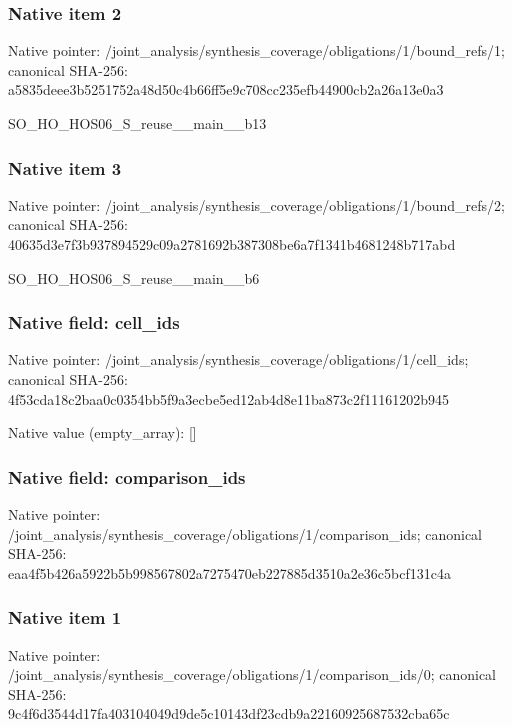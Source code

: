 \documentclass[10pt,a4paper]{article}
\begin{document}
\subsubsection{Native item 2}
Native pointer: /joint\_\allowbreak{}analysis/synthesis\_\allowbreak{}coverage/obligations/1/bound\_\allowbreak{}refs/1; canonical SHA-256: a5835deee3b5251752a48d50c4b66ff5e9c708cc235efb44900cb2a26a13e0a3

\begingroup\raggedright\sloppy SO\_\allowbreak{}HO\_\allowbreak{}HOS06\_\allowbreak{}S\_\allowbreak{}reuse\_\allowbreak{}\_\allowbreak{}main\_\allowbreak{}\_\allowbreak{}b13\par\endgroup

\subsubsection{Native item 3}
Native pointer: /joint\_\allowbreak{}analysis/synthesis\_\allowbreak{}coverage/obligations/1/bound\_\allowbreak{}refs/2; canonical SHA-256: 40635d3e7f3b937894529c09a2781692b387308be6a7f1341b4681248b717abd

\begingroup\raggedright\sloppy SO\_\allowbreak{}HO\_\allowbreak{}HOS06\_\allowbreak{}S\_\allowbreak{}reuse\_\allowbreak{}\_\allowbreak{}main\_\allowbreak{}\_\allowbreak{}b6\par\endgroup

\subsubsection{Native field: cell\_\allowbreak{}ids}
Native pointer: /joint\_\allowbreak{}analysis/synthesis\_\allowbreak{}coverage/obligations/1/cell\_\allowbreak{}ids; canonical SHA-256: 4f53cda18c2baa0c0354bb5f9a3ecbe5ed12ab4d8e11ba873c2f11161202b945

Native value (empty\_\allowbreak{}array): []

\subsubsection{Native field: comparison\_\allowbreak{}ids}
Native pointer: /joint\_\allowbreak{}analysis/synthesis\_\allowbreak{}coverage/obligations/1/comparison\_\allowbreak{}ids; canonical SHA-256: eaa4f5b426a5922b5b998567802a7275470eb227885d3510a2e36c5bcf131c4a

\subsubsection{Native item 1}
Native pointer: /joint\_\allowbreak{}analysis/synthesis\_\allowbreak{}coverage/obligations/1/comparison\_\allowbreak{}ids/0; canonical SHA-256: 9c4f6d3544d17fa403104049d9de5c10143df23cdb9a22160925687532cba65c
\end{document}
